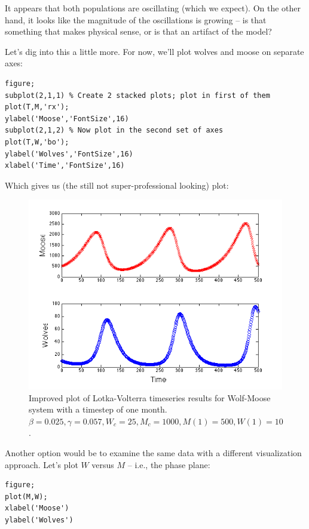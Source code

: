 It appears that both populations are oscillating (which we expect).  On the other hand, it looks like the magnitude of the oscillations is growing -- is that something that makes physical sense, or is that an artifact of the model?

Let's dig into this a little more.  For now, we'll plot wolves and moose on separate axes:

\begin{verbatim}
figure;
subplot(2,1,1) % Create 2 stacked plots; plot in first of them
plot(T,M,'rx');
ylabel('Moose','FontSize',16)
subplot(2,1,2) % Now plot in the second set of axes
plot(T,W,'bo');
ylabel('Wolves','FontSize',16)
xlabel('Time','FontSize',16)
\end{verbatim}

Which gives us (the still not super-professional looking) plot: 

\begin{figure}[h!]
\includegraphics[width=4.5in]{figs/StackedWolfMooseTimeSeries}
\caption{Improved plot of Lotka-Volterra timeseries results for Wolf-Moose system with a timestep of one month.  $\beta = 0.025, \gamma = 0.057, W_c = 25, M_c=1000, M(1) = 500, W(1) = 10$.}
\end{figure}

Another option would be to examine the same data with a different visualization approach.  Let's plot $W$ versus $M$ -- i.e., the phase plane:

\begin{verbatim}
figure;
plot(M,W);
xlabel('Moose')
ylabel('Wolves')
\end{verbatim}

